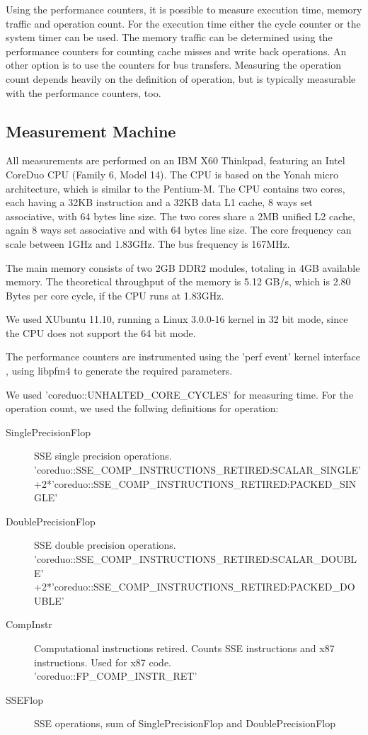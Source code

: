 \documentclass[a4paper,12pt]{article}
\begin{document}
Using the performance counters, it is possible to measure execution time, memory
traffic and operation count. For the execution time either the cycle counter or
the system timer can be used. The memory traffic can be determined using the
performance counters for counting cache misses and write back operations. An
other option is to use the counters for bus transfers. Measuring the operation count
depends heavily on the definition of operation, but is typically measurable with
the performance counters, too.

\subsection{Measurement Machine}
All measurements are performed on an IBM X60 Thinkpad, featuring an Intel
CoreDuo CPU (Family 6, Model 14). The CPU is based on the Yonah
micro architecture, which is similar to the Pentium-M. The CPU contains two
cores, each having a 32KB instruction and a 32KB data L1 cache, 8 ways set associative,
with 64 bytes line size. The two cores share a 2MB unified L2 cache, again 8
ways set associative and with 64 bytes line size. The core frequency can scale
between 1GHz and 1.83GHz. The bus frequency is 167MHz. 

The main memory consists of two 2GB DDR2 modules, totaling in 4GB available
memory. The theoretical throughput of the memory is 5.12 GB/s, which is 2.80
Bytes per core cycle, if the CPU runs at 1.83GHz.

We used XUbuntu 11.10, running a Linux 3.0.0-16 kernel in 32 bit mode, since
the CPU does not support the 64 bit mode.

The performance counters are instrumented using the 'perf event' kernel
interface \cite{unoffPerfEventsWebPage}, using libpfm4  \cite{libpfm4Docu} to
generate the required parameters.

We used 'coreduo::UNHALTED\_CORE\_CYCLES' for measuring time. For the operation
count, we used the follwing definitions for operation: 
\begin{description}
\item[SinglePrecisionFlop] SSE single precision operations.
\\{\footnotesize
'coreduo::SSE\_COMP\_INSTRUCTIONS\_RETIRED:SCALAR\_SINGLE'\\
+2*'coreduo::SSE\_COMP\_INSTRUCTIONS\_RETIRED:PACKED\_SINGLE'}
\item[DoublePrecisionFlop] SSE double precision operations.
\\{\footnotesize
'coreduo::SSE\_COMP\_INSTRUCTIONS\_RETIRED:SCALAR\_DOUBLE'\\
+2*'coreduo::SSE\_COMP\_INSTRUCTIONS\_RETIRED:PACKED\_DOUBLE'}
\item[CompInstr] Computational instructions retired. Counts SSE instructions
and x87 instructions. Used for x87 code. 
\\{\footnotesize 'coreduo::FP\_COMP\_INSTR\_RET'}
\item[SSEFlop] SSE operations, sum of SinglePrecisionFlop and
DoublePrecisionFlop
\end{description}
\end{document}
